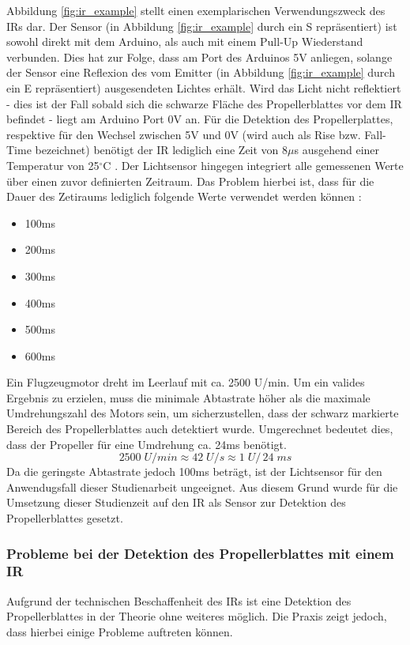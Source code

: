 Abbildung \ref{fig:ir_example} stellt einen exemplarischen Verwendungszweck des \ac{IR}s dar. 
Der Sensor (in Abbildung \ref{fig:ir_example} durch ein S repräsentiert) ist sowohl direkt mit dem Arduino, als auch mit einem Pull-Up Wiederstand verbunden.
Dies hat zur Folge, dass am Port des Arduinos 5\ac{V} anliegen, solange der Sensor eine Reflexion des vom Emitter (in Abbildung \ref{fig:ir_example} durch ein E repräsentiert) ausgesendeten Lichtes erhält.
Wird das Licht nicht reflektiert - dies ist der Fall sobald sich die schwarze Fläche des Propellerblattes vor dem \ac{IR} befindet - liegt am Arduino Port 0\ac{V} an.
Für die Detektion des Propellerplattes, respektive für den Wechsel zwischen 5V und 0V (wird auch als Rise bzw. Fall-Time bezeichnet) benötigt der \ac{IR} lediglich eine Zeit von 8$\mu$s ausgehend einer Temperatur von 25$^\circ$C \cite[S.2]{ir_datasheet}.
Der Lichtsensor hingegen integriert alle gemessenen Werte über einen zuvor definierten Zeitraum. Das Problem hierbei ist, dass für die Dauer des Zetiraums lediglich folgende Werte verwendet werden können \cite[S.13]{tsl2591_datasheet}:
\begin{itemize}
	\item 100ms
	\item 200ms
	\item 300ms
	\item 400ms
	\item 500ms
	\item 600ms
\end{itemize}
Ein Flugzeugmotor dreht im Leerlauf mit ca. 2500 U/min. Um ein valides Ergebnis zu erzielen, muss die minimale Abtastrate höher als die maximale Umdrehungszahl des Motors sein, um sicherzustellen, dass der schwarz markierte Bereich des Propellerblattes auch detektiert wurde.
Umgerechnet bedeutet dies, dass der Propeller für eine Umdrehung ca. 24ms benötigt.
\begin{equation}
2500\;U/min \approx 42\;U/s \approx 1\;U/\,24\;ms
\label{equation_revolutions}
\end{equation}
Da die geringste Abtastrate jedoch 100ms beträgt, ist der Lichtsensor für den Anwendugsfall dieser Studienarbeit ungeeignet.
Aus diesem Grund wurde für die Umsetzung dieser Studienzeit auf den \ac{IR} als Sensor zur Detektion des Propellerblattes gesetzt.

\subsubsection*{Probleme bei der Detektion des Propellerblattes mit einem \ac{IR}}
Aufgrund der technischen Beschaffenheit des \ac{IR}s ist eine Detektion des Propellerblattes in der Theorie ohne weiteres möglich.
Die Praxis zeigt jedoch, dass hierbei einige Probleme auftreten können.

